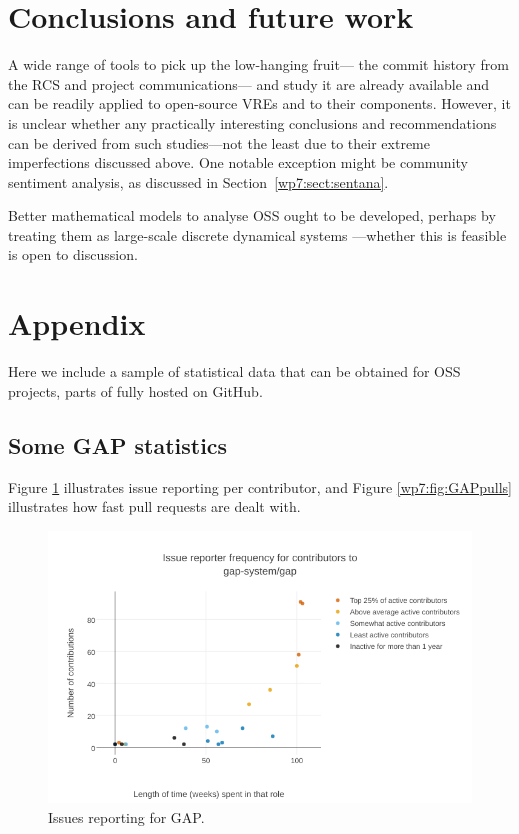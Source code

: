 \documentclass{deliverablereport}
\begin{document}
\section{Conclusions and future work}
A wide range of tools to pick up the low-hanging fruit--- 
the commit history from the RCS and project communications---
and study it are already available and can be readily applied
to open-source VREs and to their components.
However, it is unclear whether any practically interesting conclusions
and recommendations can be derived from such studies---not
the least due to their extreme imperfections discussed above.
One notable exception might be community sentiment analysis,
as discussed in Section~\ref{wp7:sect:sentana}.

Better mathematical models to analyse OSS ought to be developed, perhaps
by treating them as large-scale discrete dynamical systems
\cite{Antoulas:2005:ALD:1088857,Minati:2011:MMS:2208175}---whether
this is feasible is open to discussion.

\section*{Appendix}
Here we include a sample of statistical data that can be obtained
for OSS projects, parts of \Sage fully hosted on GitHub. 

\subsection*{Some GAP statistics}
Figure \ref{wp7:fig:GAPissues} illustrates issue reporting
per contributor, and
Figure \ref{wp7:fig:GAPpulls} illustrates how fast pull
requests are dealt with.

\begin{figure}[ht]
  \includegraphics[width=\textwidth]{gap-issuereporting}
    \caption{Issues reporting for GAP.\label{wp7:fig:GAPissues}}
\end{figure}
\end{document}
